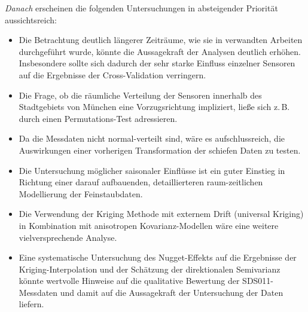 \textit{Danach} erscheinen die folgenden Untersuchungen in absteigender 
Priorität aussichtsreich:
\begin{itemize}[topsep=2pt,parsep=1pt,itemsep=0.5pt]
\item[$\circ$] Die Betrachtung deutlich längerer Zeiträume,
wie sie in verwandten Arbeiten durchgeführt wurde, könnte
die Aussagekraft der Analysen deutlich erhöhen. 
Insbesondere sollte sich dadurch der sehr starke Einfluss einzelner
Sensoren auf die Ergebnisse der Cross-Validation verringern.
\item[$\circ$] Die Frage, ob die räumliche Verteilung der Sensoren
innerhalb des Stadtgebiets von München eine Vorzugsrichtung impliziert, 
ließe sich z.\,B.\,durch einen Permutations-Test adressieren.
\item[$\circ$] Da die Messdaten nicht normal-verteilt sind, 
wäre es aufschlussreich, die Auswirkungen einer 
vorherigen Transformation der schiefen Daten zu testen.
\item[$\circ$] Die Untersuchung möglicher saisonaler Einflüsse 
ist ein guter Einstieg in Richtung einer darauf aufbauenden, 
detaillierteren raum-zeitlichen Modellierung der 
Feinstaubdaten.    
\item[$\circ$] Die Verwendung der Kriging Methode mit externem Drift 
(universal Kriging) in Kombination mit anisotropen Kovarianz-Modellen wäre 
eine weitere vielversprechende Analyse.
\item[$\circ$] Eine systematische Untersuchung des 
Nugget-Effekts auf die Ergebnisse der Kriging-Interpolation und der 
Schätzung der direktionalen Semivarianz könnte 
wertvolle Hinweise auf die qualitative Bewertung der 
SDS011-Messdaten und damit auf die Aussagekraft der 
Untersuchung der Daten liefern.
\end{itemize}






